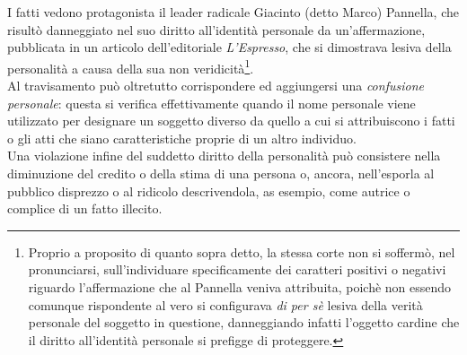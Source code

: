 I fatti vedono protagonista il leader radicale Giacinto (detto Marco) Pannella, che risultò danneggiato nel suo diritto all'identità personale da un'affermazione, pubblicata in un articolo dell'editoriale \textit{L'Espresso}, che si dimostrava lesiva della personalità a causa della sua non veridicità\footnote{Proprio a proposito di quanto sopra detto, la stessa corte non si soffermò, nel pronunciarsi, sull'individuare specificamente dei caratteri positivi o negativi riguardo l'affermazione che al Pannella veniva attribuita, poichè non essendo comunque rispondente al vero si configurava \textit{di per sè} lesiva della verità personale del soggetto in questione, danneggiando infatti l'oggetto cardine che il diritto all'identità personale si prefigge di proteggere.}.
\\Al travisamento può oltretutto corrispondere ed aggiungersi una \textit{confusione personale}: questa si verifica effettivamente quando il nome personale viene utilizzato per designare un soggetto diverso da quello a cui si attribuiscono i fatti o gli atti che siano caratteristiche proprie di un altro individuo.
\\Una violazione infine del suddetto diritto della personalità può consistere nella diminuzione del credito o della stima di una persona o, ancora, nell’esporla al pubblico disprezzo o al ridicolo descrivendola, as esempio, come autrice o complice di un fatto illecito.

